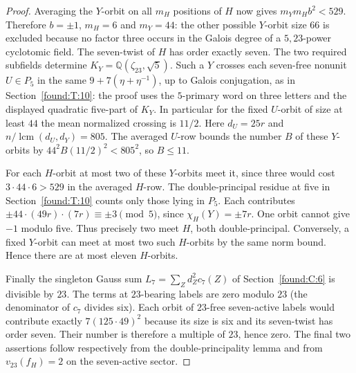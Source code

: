 \documentclass[11pt,a4paper]{article}
\numberwithin{equation}{section}
\theoremstyle{remark}
\begin{document}
\begin{proof}
Averaging the $Y$-orbit on all $m_H$ positions of $H$ now gives $m_Ym_H b^2<529$. Therefore $b=\pm1$, $m_H=6$ and $m_Y=44$: the other possible $Y$-orbit size $66$ is excluded because no factor three occurs in the Galois degree of a $5,23$-power cyclotomic field. The seven-twist of $H$ has order exactly seven. The two required subfields determine $K_Y=\mathbb Q(\zeta_{23},\sqrt5)$. Such a $Y$ crosses each seven-free nonunit $U\in P_5$ in the same $9+7(\eta+\eta^{-1})$, up to Galois conjugation, as in Section~\ref{found:T:10}: the proof uses the $5$-primary word on three letters and the displayed quadratic five-part of $K_Y$. In particular for the fixed $U$-orbit of size at least $44$ the mean normalized crossing is $11/2$. Here $d_U=25r$ and $n/\operatorname{lcm}(d_U,d_Y)=805$. The averaged $U$-row bounds the number $B$ of these $Y$-orbits by $44^2 B(11/2)^2<805^2$, so $B\le11$.

For each $H$-orbit at most two of these $Y$-orbits meet it, since three would cost $3\cdot44\cdot6>529$ in the averaged $H$-row. The double-principal residue at five in Section~\ref{found:T:10} counts only those lying in $P_5$. Each contributes $\pm44\cdot(49r)\cdot(7r)\equiv\pm3\pmod5$, since $\chi_H(Y)=\pm7r$. One orbit cannot give $-1$ modulo five. Thus precisely two meet $H$, both double-principal. Conversely, a fixed $Y$-orbit can meet at most two such $H$-orbits by the same norm bound. Hence there are at most eleven $H$-orbits.

Finally the singleton Gauss sum $L_7=\sum_Z d_Z^2c_7(Z)$ of Section~\ref{found:C:6} is divisible by $23$. The terms at $23$-bearing labels are zero modulo $23$ (the denominator of $c_7$ divides six). Each orbit of $23$-free seven-active labels would contribute exactly $7(125\cdot49)^2$ because its size is six and its seven-twist has order seven. Their number is therefore a multiple of $23$, hence zero. The final two assertions follow respectively from the double-principality lemma and from $v_{23}(f_H)=2$ on the seven-active sector.
\end{proof}
\end{document}
